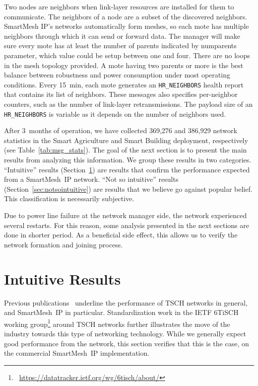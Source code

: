 \documentclass{elsarticle}
\newcommand{\smip}                {SmartMesh~IP\xspace}
\newcommand{\building}            {Smart Building\xspace}
\newcommand{\agri}                {Smart Agriculture\xspace}
\newcommand{\HRNEIGHBORS}         {{\tt HR\_NEIGHBORS}\xspace}
\newcommand{\PEACHNUMSTATS}       {369,276\xspace}
\newcommand{\EVANUMSTATS}         {386,929\xspace}
\begin{document}
\begin{itemize}
        Two nodes are neighbors when link-layer resources are installed for them to communicate.
        The neighbors of a node are a subset of the discovered neighbors.
        SmartMesh IP's networks automatically form meshes, so each mote has multiple neighbors 
        through which it can send or forward data. 
        The manager will make sure every mote has at least the number of parents indicated by numparents parameter, 
        which value could be setup between one and four. 
        There are no loops in the mesh topology provided. 
        A mote having two parents or more is the best balance between robustness and power consumption under most operating conditions.
        Every 15~min, each mote generates an \HRNEIGHBORS health report that contains its list of neighbors.
        These messages also specifies per-neighbor counters, such as the number of link-layer retransmissions.
        The payload size of an \HRNEIGHBORS is variable as it depends on the number of neighbors used.
\end{itemize}


After 3~months of operation, we have collected \PEACHNUMSTATS and \EVANUMSTATS network statistics in the \agri and \building deployment, respectively (see Table~\ref{tab:msg_stats}).
The goal of the next section is to present the main results from analyzing this information.
We group these results in two categories.
``Intuitive'' results (Section~\ref{sec:intuitive}) are results that confirm the performance expected from a \smip network.
``Not so intuitive'' results (Section~\ref{sec:notsointuitive}) are results that we believe go against popular belief.
This classification is necessarily subjective.

Due to power line failure at the network manager side, the network experienced several restarts.
For this reason, some analysis presented in the next sections are done in shorter period.
As a beneficial side effect, this allows us to verify the network formation and joining process.

\section{Intuitive Results}
\label{sec:intuitive}


Previous publications~\cite{watteyne16peach,watteyne10mitigating,watteyne09reliability,watteyne15industrial} underline the performance of TSCH networks in general, and \smip in particular.
Standardization work in the IETF 6TiSCH working group\footnote{~\url{https://datatracker.ietf.org/wg/6tisch/about/}} around TSCH networks further illustrates the move of the industry towards this type of networking technology.
While we generally expect good performance from the network, this section verifies that this is the case, on the commercial \smip implementation.
\end{document}
